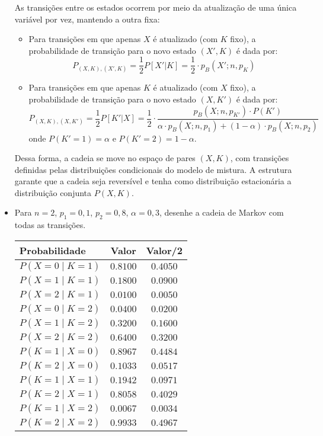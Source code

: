 \begin{itemize}
\begin{resposta}
  As transições entre os estados ocorrem por meio da atualização de uma única variável por vez, mantendo a outra fixa:

  \begin{itemize}
    \item Para transições em que apenas $X$ é atualizado (com $K$ fixo), a probabilidade de transição para o novo estado $(X', K)$ é dada por:
    $$
    P_{(X, K), (X', K)} = \frac{1}{2} P[X'|K] = \frac{1}{2} \cdot p_B(X'; n, p_K)
    $$

    \item Para transições em que apenas $K$ é atualizado (com $X$ fixo), a probabilidade de transição para o novo estado $(X, K')$ é dada por:
    $$
    P_{(X, K), (X, K')} = \frac{1}{2} P[K'|X] = \frac{1}{2} \cdot \frac{p_B(X; n, p_{K'}) \cdot P(K')}{\alpha \cdot p_B(X; n, p_1) + (1 - \alpha) \cdot p_B(X; n, p_2)}
    $$
    onde $P(K' = 1) = \alpha$ e $P(K' = 2) = 1 - \alpha$.
  \end{itemize}

  Dessa forma, a cadeia se move no espaço de pares $(X, K)$, com transições definidas pelas distribuições condicionais do modelo de mistura. A estrutura garante que a cadeia seja reversível e tenha como distribuição estacionária a distribuição conjunta $P(X, K)$.
\end{resposta}

  \newpage
  \item Para $n = 2$, $p_1 = 0{,}1$, $p_2 = 0{,}8$, $\alpha = 0{,}3$, desenhe a cadeia de Markov com todas as transições.
  \begin{resposta}

  \begin{center}
\renewcommand{\arraystretch}{1.3}
\begin{tabular}{|l|c|c|}
  \hline
  Probabilidade & Valor & Valor/2 \\
  \hline
  $P(X=0 \mid K=1)$ & $0.8100$ & $0.4050$ \\
  $P(X=1 \mid K=1)$ & $0.1800$ & $0.0900$ \\
  $P(X=2 \mid K=1)$ & $0.0100$ & $0.0050$ \\
  $P(X=0 \mid K=2)$ & $0.0400$ & $0.0200$ \\
  $P(X=1 \mid K=2)$ & $0.3200$ & $0.1600$ \\
  $P(X=2 \mid K=2)$ & $0.6400$ & $0.3200$ \\
  \hline
  $P(K=1 \mid X=0)$ & $0.8967$ & $0.4484$ \\
  $P(K=2 \mid X=0)$ & $0.1033$ & $0.0517$ \\
  $P(K=1 \mid X=1)$ & $0.1942$ & $0.0971$ \\
  $P(K=2 \mid X=1)$ & $0.8058$ & $0.4029$ \\
  $P(K=1 \mid X=2)$ & $0.0067$ & $0.0034$ \\
  $P(K=2 \mid X=2)$ & $0.9933$ & $0.4967$ \\
  \hline
\end{tabular}
\end{center}



\end{resposta}
\end{itemize}
